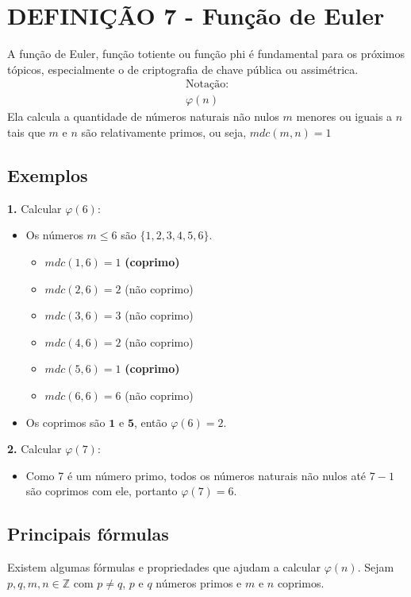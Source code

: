 \section{DEFINIÇÃO 7 - Função de Euler}
A função de Euler, função totiente ou função phi é fundamental para os próximos tópicos, especialmente o de criptografia de chave pública ou assimétrica.
\begin{gather*}
    \text{Notação:}\\
    \varphi(n)
\end{gather*}
Ela calcula a quantidade de números naturais não nulos $m$ menores ou iguais a $n$ tais que $m$ e $n$ são relativamente primos, ou seja, $mdc(m,n) = 1$

\subsection*{Exemplos}
\textbf{1.} Calcular $\varphi(6)$:

\begin{itemize}
    \item Os números $m \leq 6$ são $\{1,2,3,4,5,6\}$.
          \begin{itemize}
              \item $mdc(1,6) = 1$ \textbf{(coprimo)}
              \item $mdc(2,6) = 2$ (não coprimo)
              \item $mdc(3,6) = 3$ (não coprimo)
              \item $mdc(4,6) = 2$ (não coprimo)
              \item $mdc(5,6) = 1$ \textbf{(coprimo)}
              \item $mdc(6,6) = 6$ (não coprimo)
          \end{itemize}
    \item Os coprimos são $\mathbf{1}$ e $\mathbf{5}$, então $\varphi(6) = 2$.
\end{itemize}
\vspace{12pt}
\textbf{2.} Calcular $\varphi(7)$:

\begin{itemize}
    \item Como 7 é um número primo, todos os números naturais não nulos até $7-1$ são coprimos com ele, portanto $\varphi(7)=6$.
\end{itemize}

\subsection{Principais fórmulas}
Existem algumas fórmulas e propriedades que ajudam a calcular $\varphi(n)$. Sejam $p,q,m,n \in \mathbb{Z}$ com $p \neq q$, $p$ e $q$ números primos e $m$ e $n$ coprimos.

